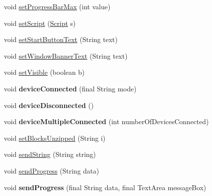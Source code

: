 \begin{DoxyCompactItemize}
\item 
void \hyperlink{classcom_1_1casual__dev_1_1jodin_1_1_j_odin_controller_a9fc379ea03c064cdd0ecfe67cf233190}{set\-Progress\-Bar\-Max} (int value)
\item 
void \hyperlink{classcom_1_1casual__dev_1_1jodin_1_1_j_odin_controller_a74e2c4687d246331407387216aa909ad}{set\-Script} (\hyperlink{class_c_a_s_u_a_l_1_1caspac_1_1_script}{Script} s)
\item 
void \hyperlink{classcom_1_1casual__dev_1_1jodin_1_1_j_odin_controller_a0c6d5c9a799ae503fb10481b5d38ed42}{set\-Start\-Button\-Text} (String text)
\item 
void \hyperlink{classcom_1_1casual__dev_1_1jodin_1_1_j_odin_controller_a6c016c7337575849493a4572ed7533c6}{set\-Window\-Banner\-Text} (String text)
\item 
void \hyperlink{classcom_1_1casual__dev_1_1jodin_1_1_j_odin_controller_a8e98fa07a5afa5d7dcc4b62290cd222c}{set\-Visible} (boolean b)
\item 
\hypertarget{classcom_1_1casual__dev_1_1jodin_1_1_j_odin_controller_a71fed09a9d3e97e402ece250dffd0f44}{void {\bfseries device\-Connected} (final String mode)}\label{classcom_1_1casual__dev_1_1jodin_1_1_j_odin_controller_a71fed09a9d3e97e402ece250dffd0f44}

\item 
\hypertarget{classcom_1_1casual__dev_1_1jodin_1_1_j_odin_controller_ad60e3731c0de053f272cc7169117cd32}{void {\bfseries device\-Disconnected} ()}\label{classcom_1_1casual__dev_1_1jodin_1_1_j_odin_controller_ad60e3731c0de053f272cc7169117cd32}

\item 
\hypertarget{classcom_1_1casual__dev_1_1jodin_1_1_j_odin_controller_aea1baa9d74cc8f4e409cc3a3750df285}{void {\bfseries device\-Multiple\-Connected} (int number\-Of\-Devices\-Connected)}\label{classcom_1_1casual__dev_1_1jodin_1_1_j_odin_controller_aea1baa9d74cc8f4e409cc3a3750df285}

\item 
void \hyperlink{classcom_1_1casual__dev_1_1jodin_1_1_j_odin_controller_a5cbc8ccbf3426240b87f9be622d75b19}{set\-Blocks\-Unzipped} (String i)
\item 
void \hyperlink{classcom_1_1casual__dev_1_1jodin_1_1_j_odin_controller_aff55b9fd296d8e8b0b1af3cae90e1179}{send\-String} (String string)
\item 
void \hyperlink{classcom_1_1casual__dev_1_1jodin_1_1_j_odin_controller_a87665ab1c310fb28668a5e2707d37536}{send\-Progress} (String data)
\item 
\hypertarget{classcom_1_1casual__dev_1_1jodin_1_1_j_odin_controller_ae4c4e0212d6c0b0737be013f1254b6f0}{void {\bfseries send\-Progress} (final String data, final Text\-Area message\-Box)}\label{classcom_1_1casual__dev_1_1jodin_1_1_j_odin_controller_ae4c4e0212d6c0b0737be013f1254b6f0}


\end{DoxyCompactItemize}
